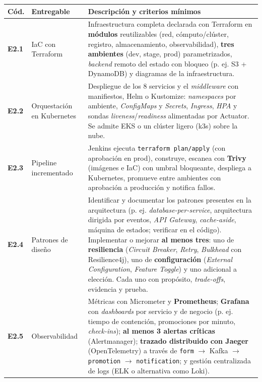 \documentclass[10pt,letterpaper]{article}
\begin{document}
\vspace{0.04cm}
\noindent\small
\begin{tabularx}{\textwidth}{|L{1.0cm}|L{3.3cm}|X|}
\hline
{}
\textbf{Cód.} & \textbf{Entregable} & \textbf{Descripción y criterios mínimos} \\ \hline
\textbf{E2.1} & IaC con Terraform & Infraestructura completa declarada con Terraform en \textbf{módulos} reutilizables (red, cómputo/clúster, registro, almacenamiento, observabilidad), \textbf{tres ambientes} (dev, stage, prod) parametrizados, \textit{backend} remoto del estado con bloqueo (p. ej. S3 + DynamoDB) y diagramas de la infraestructura. \\ \hline
\textbf{E2.2} & Orquestación en Kubernetes & Despliegue de los 8 servicios y el \textit{middleware} con manifiestos, Helm o Kustomize: \textit{namespaces} por ambiente, \textit{ConfigMaps} y \textit{Secrets}, \textit{Ingress}, \textit{HPA} y sondas \textit{liveness}/\textit{readiness} alimentadas por Actuator. Se admite EKS o un clúster ligero (k3s) sobre la nube. \\ \hline
\textbf{E2.3} & Pipeline incrementado & Jenkins ejecuta \texttt{terraform plan/apply} (con aprobación en prod), construye, escanea con \textbf{Trivy} (imágenes e IaC) con umbral bloqueante, despliega a Kubernetes, promueve entre ambientes con aprobación a producción y notifica fallos. \\ \hline
\textbf{E2.4} & Patrones de diseño & Identificar y documentar los patrones presentes en la arquitectura (p. ej. \textit{database-per-service}, arquitectura dirigida por eventos, \textit{API Gateway}, \textit{cache-aside}, máquina de estados; verificar en el código). Implementar o mejorar \textbf{al menos tres}: uno de \textbf{resiliencia} (\textit{Circuit Breaker}, \textit{Retry}, \textit{Bulkhead} con Resilience4j), uno de \textbf{configuración} (\textit{External Configuration}, \textit{Feature Toggle}) y uno adicional a elección. Cada uno con propósito, \textit{trade-offs}, evidencia y prueba. \\ \hline
\textbf{E2.5} & Observabilidad & Métricas con Micrometer y \textbf{Prometheus}; \textbf{Grafana} con \textit{dashboards} por servicio y de negocio (p. ej. tiempo de contención, promociones por minuto, \textit{check-ins}); \textbf{al menos 3 alertas críticas} (Alertmanager); \textbf{trazado distribuido con Jaeger} (OpenTelemetry) a través de \texttt{form} $\rightarrow$ Kafka $\rightarrow$ \texttt{promotion} $\rightarrow$ \texttt{notification}; y gestión centralizada de logs (ELK o alternativa como Loki). \\ \hline

\end{tabularx}
\end{document}
